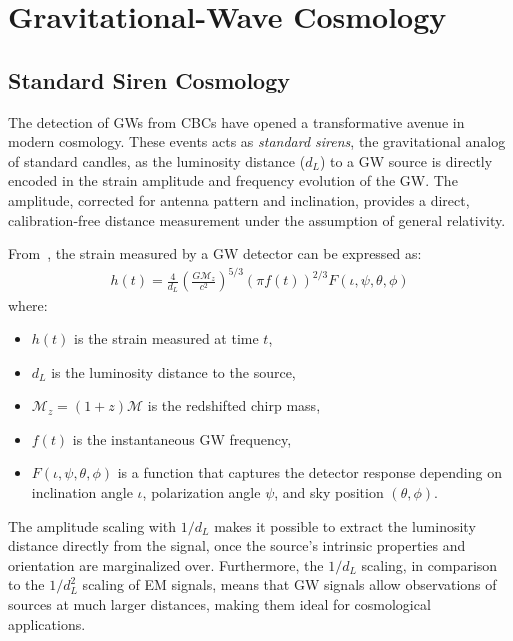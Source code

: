\chapter{Gravitational-Wave Cosmology}
\label{chap:dark-siren-cosmology}

\section{Standard Siren Cosmology}

The detection of \acfp{GW} from \acp{CBC} have opened a transformative avenue in modern cosmology. These events acts as \textit{standard sirens}, the gravitational analog of standard candles, as the luminosity distance ($d_L$) to a \ac{GW} source is directly encoded in the strain amplitude and frequency evolution of the \ac{GW}. The amplitude, corrected for antenna pattern and inclination, provides a direct, calibration-free distance measurement under the assumption of general relativity.

From~\citet{maggiore2007gravitational}, the strain measured by a GW detector can be expressed as:
\begin{align}
h(t) = \frac{4}{d_L} \left( \frac{G\mathcal{M}_z}{c^2} \right)^{5/3}
       \left( \pi f(t) \right)^{2/3} F(\iota, \psi, \theta, \phi)
\label{eq:gw_strain}
\end{align}
where:
\vspace{-1em}
\begin{itemize}
    \item $h(t)$ is the strain measured at time $t$,
    \vspace{-1em}
    \item $d_L$ is the luminosity distance to the source,
    \vspace{-1em}
    \item $\mathcal{M}_z = (1+z)\mathcal{M}$ is the redshifted chirp mass,
    \vspace{-1em}
    \item $f(t)$ is the instantaneous GW frequency,
    \vspace{-1em}
    \item $F(\iota, \psi, \theta, \phi)$ is a function that captures the detector response depending on inclination angle $\iota$, polarization angle $\psi$, and sky position $(\theta, \phi)$.
\end{itemize}

The amplitude scaling with $1/d_L$ makes it possible to extract the luminosity distance directly from the signal, once the source's intrinsic properties and orientation are marginalized over. Furthermore, the $1/d_L$ scaling, in comparison to the $1/d_L^2$ scaling of \ac{EM} signals, means that \ac{GW} signals allow observations of sources at much larger distances, making them ideal for cosmological applications.

